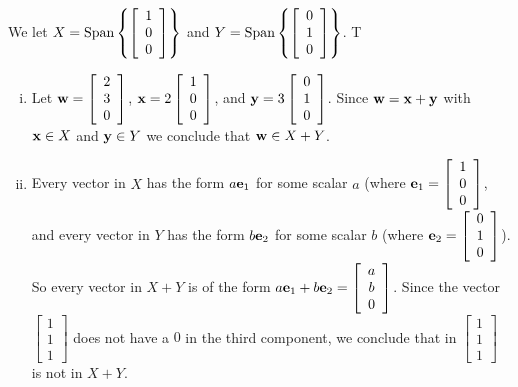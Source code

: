 \begin{example}
\ExampleSolution 
\ba
\item We let $X = \text{Span}\left\{ \left[ \begin{array}{c} 1\\0\\0 \end{array} \right] \right\}$ and $Y = \text{Span}\left\{ \left[ \begin{array}{c} 0\\1\\0 \end{array} \right] \right\}$. T
	\begin{enumerate}[i.]
	\item Let $\mathbf{w} = \left[ \begin{array}{c} 2\\3\\0 \end{array} \right]$, $\mathbf{x} = 2\left[ \begin{array}{c} 1\\0\\0 \end{array} \right] $, and $\mathbf{y} = 3\left[ \begin{array}{c} 0\\1\\0 \end{array} \right]$. Since $\mathbf{w} = \mathbf{x}+\mathbf{y}$ with $\mathbf{x} \in X$ and $\mathbf{y} \in Y$ we conclude that $\mathbf{w} \in X + Y$. 
		
	\item Every vector in $X$ has the form $a \mathbf{e}_1$ for some scalar $a$ (where $\mathbf{e}_1 = \left[ \begin{array}{c} 1\\0\\0 \end{array} \right]$, and every vector in $Y$ has the form $b \mathbf{e}_2$ for some scalar $b$ (where $\mathbf{e}_2 = \left[ \begin{array}{c} 0\\1\\0 \end{array} \right]$). So every vector in $X+Y$ is of the form $a\mathbf{e}_1 + b\mathbf{e}_2 = \left[ \begin{array}{c} a\\b\\0 \end{array} \right]$. Since the vector $\left[ \begin{array}{c} 1\\1\\1 \end{array} \right]$ does not have a $0$ in the third component, we conclude that in $\left[ \begin{array}{c} 1\\1\\1 \end{array} \right]$ is not in $X+Y$.
	

\end{enumerate}
\end{example}
